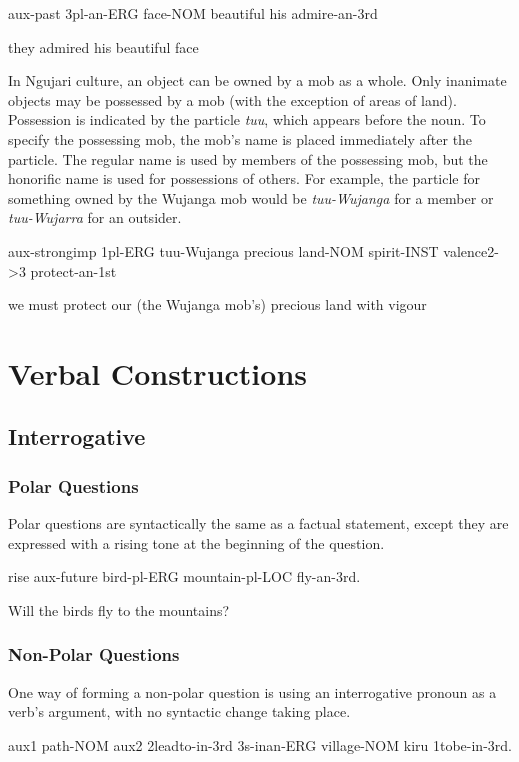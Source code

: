 aux-past 3pl-an-ERG face-NOM beautiful his admire-an-3rd

they admired his beautiful face

In Ngujari culture, an object can be owned by a mob as a whole. Only inanimate
objects may be possessed by a mob (with the exception of areas of land).
Possession is indicated by the particle \textit{tuu}, which appears before the noun. To
specify the possessing mob, the mob's name is placed immediately after the
particle. The regular name is used by members of the possessing mob, but the
honorific name is used for possessions of others. For example, the particle for
something owned by the Wujanga mob would be \textit{tuu-Wujanga} for a member or
\textit{tuu-Wujarra} for an outsider.

aux-strongimp 1pl-ERG tuu-Wujanga precious land-NOM spirit-INST valence2->3
protect-an-1st

we must protect our (the Wujanga mob's) precious land with vigour

\section{Verbal Constructions}

\subsection{Interrogative}

\subsubsection{Polar Questions}

Polar questions are syntactically the same as a factual statement, except they
are expressed with a rising tone at the beginning of the question.

rise aux-future bird-pl-ERG mountain-pl-LOC fly-an-3rd.

Will the birds fly to the mountains?

\subsubsection{Non-Polar Questions}

One way of forming a non-polar question is using an interrogative pronoun as a
verb's argument, with no syntactic change taking place.

aux1 path-NOM aux2 2leadto-in-3rd 3s-inan-ERG village-NOM kiru 1tobe-in-3rd.

